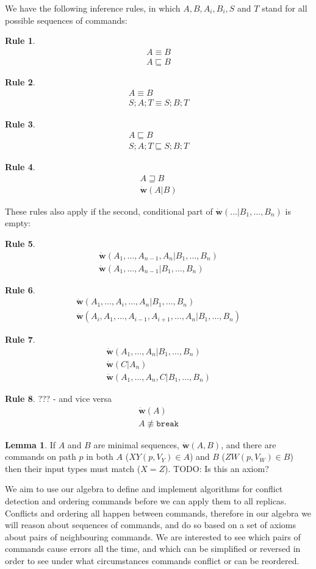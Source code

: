 \documentclass[12pt]{article}
\newcommand{\cbrk}{\mathtt{break}}
\newcommand{\fscommand}[2]{{#1#2}}
\newcommand{\cxy}{\fscommand{X}{Y}}
\newcommand{\czw}{\fscommand{Z}{W}}
\newcommand{\eqext}{\sqsubseteq}
\newcommand{\eqnrw}{\sqsupseteq}
\newcommand{\nequiv}{\not\equiv}
\newcommand{\works}[1]{\dot{\mathbf{w}}({#1})}
\newcommand{\worksc}[2]{\dot{\mathbf{w}}({#1}|{#2})}
\newcommand{\infer}[2]{\begin{array}{c}{#1}\\\hline{#2}\end{array}}
\newcommand{\inferr}[3]{\begin{array}{c}{#1}\\{#2}\\\hline{#3}\end{array}}
\theoremstyle{definition}
\newtheorem{mylem}{Lemma}
\newtheorem{myrul}{Rule}
\begin{document}
We have the following inference rules, in which $A,B,A_i,B_i,S$ and $T$ stand for all possible sequences of commands:


\begin{myrul}\label{r_eq_ex}
\[\infer{A\equiv B}{A\eqext B}\]
\end{myrul}

\begin{myrul}
\[\infer{A\equiv B}{S;A;T\equiv S;B;T}\]
\end{myrul}

\begin{myrul}
\[\infer{A\eqext B}{S;A;T\eqext S;B;T}\]
\end{myrul}

\begin{myrul}\label{r_ex_w}
\[\infer{A\eqnrw B}{\worksc{A}{B}}\]
\end{myrul}

These rules also apply if the second, conditional part of $\worksc{\ldots}{B_1,\ldots,B_n}$ is empty:

\begin{myrul}
\[\infer{\worksc{A_1,\ldots,A_{n-1},A_n}{B_1,\ldots,B_n}}{\worksc{A_1,\ldots,A_{n-1}}{B_1,\ldots,B_n}}\]
\end{myrul}

\begin{myrul}
\[\infer{\worksc{A_1,\ldots,A_i,\ldots,A_n}{B_1,\ldots,B_n}}{\worksc{A_i,A_1,\ldots,A_{i-1},A_{i+1},\ldots,A_n}{B_1,\ldots,B_n}}\]
\end{myrul}

\begin{myrul}\label{r_w_w}
\[\inferr{\worksc{A_1,\ldots,A_n}{B_1,\ldots,B_n}}{\worksc{C}{A_n}}{\worksc{A_1,\ldots,A_n,C}{B_1,\ldots,B_n}}\]
\end{myrul}

\begin{myrul}{??? - and vice versa}
\[\infer{\works{A}}{A\nequiv\cbrk}\]
\end{myrul}

\begin{mylem}\label{worksinputmatch}
If $A$ and $B$ are minimal sequences, $\works{A,B}$,
and there are commands on path $p$ in both $A$ ($\cxy(p, V_Y)\in A$) and $B$ ($\czw(p, V_W)\in B$)
then their input types must match ($X=Z$).
TODO: Is this an axiom?
\end{mylem}


We aim to use our algebra to define and implement algorithms for conflict detection
and ordering commands before we can apply them to all replicas.
Conflicts and ordering all happen between commands, therefore in our algebra
we will reason about sequences of commands, 
and do so based on a set of axioms about pairs of neighbouring commands.
We are interested to see which pairs of commands cause errors all the time,
and which can be simplified or reversed
in order to see under what circumstances commands conflict or can be reordered.
\end{document}
